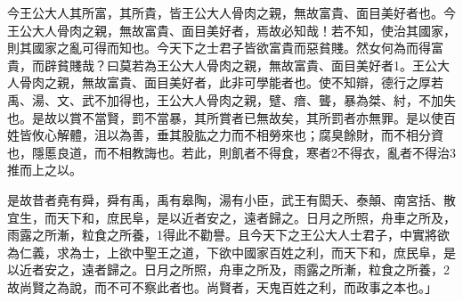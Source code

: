 \begin{pinyinscope}
今王公大人其所富，其所貴，皆王公大人骨肉之親，無故富貴、面目美好者也。今王公大人骨肉之親，無故富貴、面目美好者，焉故必知哉！若不知，使治其國家，則其國家之亂可得而知也。今天下之士君子皆欲富貴而惡貧賤。然女何為而得富貴，而辟貧賤哉？曰莫若為王公大人骨肉之親，無故富貴、面目美好者1。王公大人骨肉之親，無故富貴、面目美好者，此非可學能者也。使不知辯，德行之厚若禹、湯、文、武不加得也，王公大人骨肉之親，躄、瘖、聾，暴為桀、紂，不加失也。是故以賞不當賢，罰不當暴，其所賞者已無故矣，其所罰者亦無罪。是以使百姓皆攸心解體，沮以為善，垂其股肱之力而不相勞來也；腐臭餘財，而不相分資也，隱慝良道，而不相教誨也。若此，則飢者不得食，寒者2不得衣，亂者不得治3推而上之以。

是故昔者堯有舜，舜有禹，禹有皋陶，湯有小臣，武王有閎夭、泰顛、南宮括、散宜生，而天下和，庶民阜，是以近者安之，遠者歸之。日月之所照，舟車之所及，雨露之所漸，粒食之所養，1得此不勸譽。且今天下之王公大人士君子，中實將欲為仁義，求為士，上欲中聖王之道，下欲中國家百姓之利，而天下和，庶民阜，是以近者安之，遠者歸之。日月之所照，舟車之所及，雨露之所漸，粒食之所養，2故尚賢之為說，而不可不察此者也。尚賢者，天鬼百姓之利，而政事之本也。」


\end{pinyinscope}